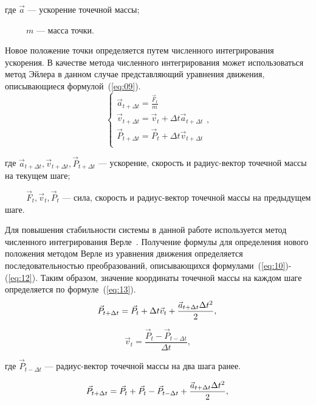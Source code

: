         где $\vec{a}$ --- ускорение точечной массы;

        ~~~~~$m$ --- масса точки.

Новое положение точки определяется путем численного интегрирования ускорения.  В
качестве метода численного интегрирования может использоваться метод Эйлера в
данном случае представляющий уравнения движения, описывающиеся
формулой~(\ref{eq:09}). 
\begin{equation}\label{eq:09}
    \begin{cases}
        \vec{a}_{t+\Delta t} = \frac{\vec{F}_{t}}{m} \\
        \vec{v}_{t+\Delta t} = \vec{v}_{t} + \Delta t\vec{a}_{t+\Delta t} \\
        \vec{P}_{t+\Delta t} = \vec{P}_{t} + \Delta t\vec{v}_{t+\Delta t} \\
    \end{cases}
    ,
\end{equation}

где $\vec{a}_{t+\Delta t}, \vec{v}_{t+\Delta t}, \vec{P}_{t+\Delta t}$ ---
ускорение, скорость и радиус-вектор точечной массы на текущем шаге;

~~~~~$\vec{F}_{t}, \vec{v}_{t}, \vec{P}_{t}$ --- сила, скорость и радиус-вектор
точечной массы на предыдущем шаге.

Для повышения стабильности системы в данной работе используется метод численного
интегрирования Верле~\cite{bib01}. Получение формулы для определения нового
положения методом Верле из уравнения движения определяется последовательностью
преобразований, описывающихся формулами~(\ref{eq:10})-(\ref{eq:12}).  Таким
образом, значение координаты точечной массы на каждом шаге определяется по
формуле~(\ref{eq:13}).
\begin{equation}\label{eq:10}
    \vec{P}_{t+\Delta t} = \vec{P}_{t} + \Delta t\vec{v}_{t} +
    \frac{\vec{a}_{t+\Delta t}\Delta{t}^2}{2}, \\
\end{equation}

\begin{equation}\label{eq:11}
    \vec{v}_{t} = \frac{\vec{P}_{t} - \vec{P}_{t-\Delta t}}{\Delta t},
\end{equation}

где $\vec{P}_{t-\Delta t}$ --- радиус-вектор точечной массы на два шага ранее.

\begin{equation}\label{eq:12}
    \vec{P}_{t+\Delta t} = \vec{P}_{t} + \vec{P}_{t} - \vec{P}_{t-\Delta t} +
    \frac{\vec{a}_{t+\Delta t}\Delta{t}^2}{2}, \\
\end{equation}

